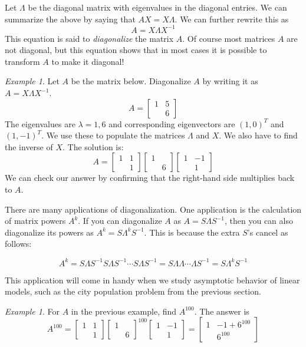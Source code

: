 \documentclass[11pt,oneside]{amsbook}
\theoremstyle{definition}
\theoremstyle{plain}
\theoremstyle{definition}
\theoremstyle{remark}
\newtheorem{example}[theorem]{Example}
\numberwithin{equation}{section}
\numberwithin{figure}{section}
\begin{document}
Let $\Lambda$ be the diagonal matrix with eigenvalues in the diagonal entries. We can summarize the above by saying that $AX=X\Lambda$. We can further rewrite this as
\[A=X\Lambda X^{-1}
\]
This equation is said to \emph{diagonalize} the matrix $A$. Of course most matrices $A$ are not diagonal, but this equation shows that in most cases it is possible to transform $A$ to make it diagonal!

\begin{example}
  Let $A$ be the matrix below. Diagonalize $A$ by writing it as $A=X\Lambda X^{-1}$.
  \[A=\begin{bmatrix}1&5\\&6\end{bmatrix}
  \]
  The eigenvalues are $\lambda=1,6$ and corresponding eigenvectors are $(1,0)^T$ and $(1,-1)^T$. We use these to populate the matrices $\Lambda$ and $X$. We also have to find the inverse of $X$. The solution is:
  \[A=\begin{bmatrix}1&1\\&1\end{bmatrix}
    \begin{bmatrix}1&\\&6\end{bmatrix}
    \begin{bmatrix}1&-1\\&1\end{bmatrix}
  \]
  We can check our answer by confirming that the right-hand side multiplies back to $A$.
\end{example}

There are many applications of diagonalization. One application is the calculation of matrix powers $A^k$. If you can diagonalize $A$ as $A=S\Lambda S^{-1}$, then you can also diagonalize its powers as $A^k=S\Lambda^kS^{-1}$. This is because the extra $S$'s cancel as follows:

\[A^k=S\Lambda S^{-1}S\Lambda S^{-1}\cdots S\Lambda S^{-1}
=S\Lambda\Lambda\cdots\Lambda S^{-1}=S\Lambda^kS^{-1}
\]

This application will come in handy when we study asymptotic behavior of linear models, such as the city population problem from the previous section.

\begin{example}
  For $A$ in the previous example, find $A^{100}$. The answer is
  \[A^{100}=\begin{bmatrix}1&1\\&1\end{bmatrix}
    \begin{bmatrix}1&\\&6\end{bmatrix}^{100}
    \begin{bmatrix}1&-1\\&1\end{bmatrix}
    =\begin{bmatrix}1&-1+6^{100}\\&6^{100}\end{bmatrix}
  \]
\end{example}
\end{document}
